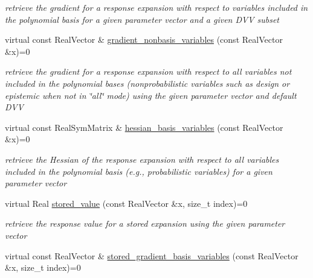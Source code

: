\begin{DoxyCompactItemize}
\begin{DoxyCompactList}\small\item\em retrieve the gradient for a response expansion with respect to variables included in the polynomial basis for a given parameter vector and a given D\+VV subset \end{DoxyCompactList}\item 
virtual const Real\+Vector \& \hyperlink{classPecos_1_1PolynomialApproximation_a4aacf10d0420769485310745b8643a2b}{gradient\+\_\+nonbasis\+\_\+variables} (const Real\+Vector \&x)=0\label{classPecos_1_1PolynomialApproximation_a4aacf10d0420769485310745b8643a2b}

\begin{DoxyCompactList}\small\item\em retrieve the gradient for a response expansion with respect to all variables not included in the polynomial bases (nonprobabilistic variables such as design or epistemic when not in \char`\"{}all\char`\"{} mode) using the given parameter vector and default D\+VV \end{DoxyCompactList}\item 
virtual const Real\+Sym\+Matrix \& \hyperlink{classPecos_1_1PolynomialApproximation_a735ab9f5114a1c5ef68dfa34d270a2a3}{hessian\+\_\+basis\+\_\+variables} (const Real\+Vector \&x)=0\label{classPecos_1_1PolynomialApproximation_a735ab9f5114a1c5ef68dfa34d270a2a3}

\begin{DoxyCompactList}\small\item\em retrieve the Hessian of the response expansion with respect to all variables included in the polynomial basis (e.\+g., probabilistic variables) for a given parameter vector \end{DoxyCompactList}\item 
virtual Real \hyperlink{classPecos_1_1PolynomialApproximation_a3bc7383faad1dad8b9b1e27860e11bb6}{stored\+\_\+value} (const Real\+Vector \&x, size\+\_\+t index)=0\label{classPecos_1_1PolynomialApproximation_a3bc7383faad1dad8b9b1e27860e11bb6}

\begin{DoxyCompactList}\small\item\em retrieve the response value for a stored expansion using the given parameter vector \end{DoxyCompactList}\item 
virtual const Real\+Vector \& \hyperlink{classPecos_1_1PolynomialApproximation_ac0a4a7a7c14b9c8e8efe31ce1499abc7}{stored\+\_\+gradient\+\_\+basis\+\_\+variables} (const Real\+Vector \&x, size\+\_\+t index)=0\label{classPecos_1_1PolynomialApproximation_ac0a4a7a7c14b9c8e8efe31ce1499abc7}


\end{DoxyCompactItemize}
